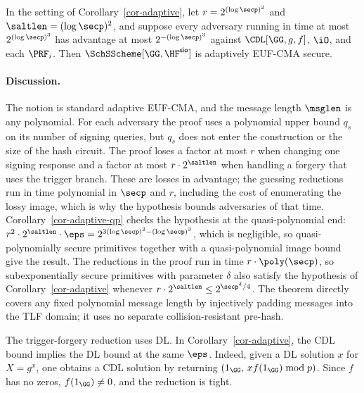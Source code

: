 \begin{corollary} \label{cor-adaptive-qp}
In the setting of Corollary~\ref{cor-adaptive}, let $r = 2^{(\log\secp)^2}$ and $\saltlen = (\log\secp)^2$, and suppose every adversary running in time at most $2^{(\log\secp)^3}$ has advantage at most $2^{-(\log\secp)^3}$ against $\CDL[\GG,g,f]$, $\iO$, and each $\PRF_i$. Then $\SchSScheme[\GG, \HF^{\mathsf{sio}}]$ is adaptively EUF-CMA secure.
\end{corollary}

\paragraph*{Discussion.} The notion is standard adaptive EUF-CMA, and the message length $\msglen$ is any polynomial. For each adversary the proof uses a polynomial upper bound $q_s$ on its number of signing queries, but $q_s$ does not enter the construction or the size of the hash circuit. The proof loses a factor at most $r$ when changing one signing response and a factor at most $r\cdot2^{\saltlen}$ when handling a forgery that uses the trigger branch. These are losses in advantage; the guessing reductions run in time polynomial in $\secp$ and $r$, including the cost of enumerating the lossy image, which is why the hypothesis bounds adversaries of that time. Corollary~\ref{cor-adaptive-qp} checks the hypothesis at the quasi-polynomial end: $r^2\cdot2^{\saltlen}\cdot\eps = 2^{3(\log\secp)^2 - (\log\secp)^3}$, which is negligible, so quasi-polynomially secure primitives together with a quasi-polynomial image bound give the result. The reductions in the proof run in time $r\cdot\poly(\secp)$, so subexponentially secure primitives with parameter $\delta$ also satisfy the hypothesis of Corollary~\ref{cor-adaptive} whenever $r\cdot2^{\saltlen} \le 2^{\secp^{\delta}/4}$. The theorem directly covers any fixed polynomial message length by injectively padding messages into the TLF domain; it uses no separate collision-resistant pre-hash.

The trigger-forgery reduction uses DL. In Corollary~\ref{cor-adaptive}, the CDL bound implies the DL bound at the same $\eps$. Indeed, given a DL solution $x$ for $X = g^x$, one obtains a CDL solution by returning $(1_\GG,\, x f(1_\GG) \bmod p)$. Since $f$ has no zeros, $f(1_\GG) \ne 0$, and the reduction is tight.

